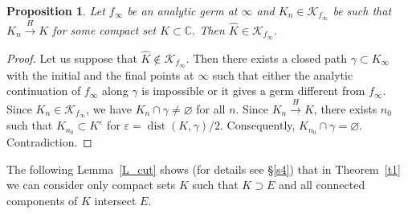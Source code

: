 \documentclass[12pt]{article}
\newtheorem{Proposition}{Proposition}
\let\myh\widehat
\def\CC{\mathbb C}
\def\KKf{\mathcal K_{f_\infty}}
\def\dist{\operatorname{dist}}
\begin{document}
\begin{Proposition}
\label{Prop_H}
Let $f_\infty$ be an analytic germ at $\infty$ and $K_n\in\KKf$ be such that $K_n\xrightarrow{H}K$ for some compact set $K\subset\CC$. Then $\myh K\in\KKf$.
\end{Proposition}
\begin{proof}
Let us suppose that $\myh K\notin\KKf$. Then there exists a closed path $\gamma\subset K_\infty$ with the initial and the final points at $\infty$ such that either the analytic continuation of $f_\infty$ along $\gamma$ is impossible or it gives a germ different from $f_\infty$. Since $K_n\in\KKf$, we have $K_n\cap\gamma\ne\varnothing$ for all $n$. Since $K_n\xrightarrow{H}K$, there exists $n_0$ such that $K_{n_0}\subset K^\varepsilon$ for $\varepsilon=\dist(K, \gamma)/2$. Consequently, $K_{n_0}\cap \gamma=\varnothing$. Contradiction.
\end{proof}

The following Lemma~\ref{L_cut} shows (for details see \S\ref{s4}) that in Theorem~\ref{t1} we can consider only compact sets $K$ such that $K\supset E$ and all  connected components of $K$ intersect $E$. 
\end{document}
